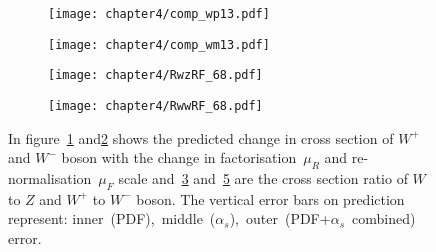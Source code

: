 \documentclass[a4paper,12pt]{report}
\numberwithin{equation}{section}
\begin{document}
\begin{figure}[H]
\centering
\begin{subfigure}{0.8\textwidth}
\texttt{[image: chapter4/comp\_wp13.pdf]}
\vspace*{-8mm}
\caption{}
\label{varwp13}
\end{subfigure}
\begin{subfigure}{0.8\textwidth}
\texttt{[image: chapter4/comp\_wm13.pdf]}
\vspace*{-8mm}
\caption{}
\label{varwm13}
\end{subfigure}
\begin{subfigure}{0.8\textwidth}
\texttt{[image: chapter4/RwzRF\_68.pdf]}
\vspace*{-8mm}
\caption{}
\label{var_rat13}
\end{subfigure}
\begin{subfigure}{0.8\textwidth}
\texttt{[image: chapter4/RwwRF\_68.pdf]}
\vspace*{-8mm}
\caption{}
\label{var_rat131}
\end{subfigure}
\caption{In figure~\ref{varwp13} and\ref{varwm13} shows the predicted change in cross section of $W^{+}$ and $W^{-}$ boson with the change in factorisation~$\mu_{R}$ and re-normalisation~$\mu_{F}$ scale and~\ref{var_rat13} and~\ref{var_rat131} are the cross section ratio of $W$ to $Z$ and $W^{+}$ to $W^{-}$  boson. The vertical error bars on prediction represent: inner~(PDF),~middle~($\alpha_{s}$),~outer~(PDF+$\alpha_{s}$~combined) error.}
\end{figure}
\end{document}
